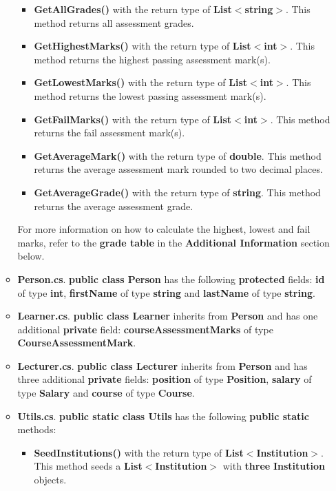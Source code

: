 \documentclass{article}
\begin{document}
\begin{itemize}
\begin{itemize}
\begin{itemize}
            \item \textbf{GetAllGrades()} with the return type of \textbf{List$<$string$>$}. This method returns all assessment grades.
            \item \textbf{GetHighestMarks()} with the return type of \textbf{List$<$int$>$}. This method returns the highest passing assessment mark(s).
            \item \textbf{GetLowestMarks()} with the return type of \textbf{List$<$int$>$}. This method returns the lowest passing assessment mark(s). 
            \item \textbf{GetFailMarks()} with the return type of \textbf{List$<$int$>$}. This method returns the fail assessment mark(s).
            \item \textbf{GetAverageMark()} with the return type of \textbf{double}. This method returns the average assessment mark rounded to two decimal places.
            \item \textbf{GetAverageGrade()} with the return type of \textbf{string}. This method returns the average assessment grade.
        \end{itemize}
        For more information on how to calculate the highest, lowest and fail marks, refer to the \textbf{grade table} in the \textbf{Additional Information} section below.
        \item \textbf{Person.cs}. \textbf{public class Person} has the following \textbf{protected} fields: \textbf{id} of type \textbf{int}, \textbf{firstName} of type \textbf{string} and \textbf{lastName} of type \textbf{string}.
        \item \textbf{Learner.cs}. \textbf{public class Learner} inherits from \textbf{Person} and has one additional \textbf{private} field: \textbf{courseAssessmentMarks} of type \textbf{CourseAssessmentMark}.
        \item \textbf{Lecturer.cs}. \textbf{public class Lecturer} inherits from \textbf{Person} and has three additional \textbf{private} fields: \textbf{position} of type \textbf{Position}, \textbf{salary} of type \textbf{Salary} and \textbf{course} of type \textbf{Course}.
        \item \textbf{Utils.cs}. \textbf{public static class Utils} has the following \textbf{public static} methods:
        \begin{itemize}
            \item \textbf{SeedInstitutions()} with the return type of \textbf{List$<$Institution$>$}. This method seeds a \textbf{List$<$Institution$>$} with \textbf{three} \textbf{Institution} objects.

\end{itemize}
\end{itemize}
\end{itemize}
\end{document}
